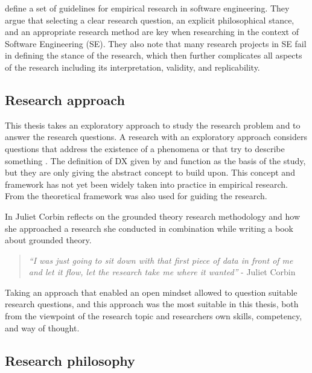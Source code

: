 \documentclass[english, 12pt, a4paper, sci, utf8, a-1b, online]{aaltothesis}
\begin{document}
\textcite{easterbrook2008selecting} define a set of guidelines for empirical research in software engineering. They argue that selecting a clear research question, an explicit philosophical stance, and an appropriate research method are key when researching in the context of Software Engineering (SE). They also note that many research projects in SE fail in defining the stance of the research, which then further complicates all aspects of the research including its interpretation, validity, and replicability.

\subsection{Research approach}

This thesis takes an exploratory approach to study the research problem and to answer the research questions. A research with an exploratory approach considers questions that address the existence of a phenomena or that try to describe something \parencite{easterbrook2008selecting}. The definition of DX given by \textcite{fagerholm-dx-concept-and-definition} and \textcite{fagerholm-doctoral-thesis} function as the basis of the study, but they are only giving the abstract concept to build upon. This concept and framework has not yet been widely taken into practice in empirical research. From \textcite{fagerholm-doctoral-thesis} the theoretical framework was also used for guiding the research.

In \textcite{developing-grounded-theory} Juliet Corbin reflects on the grounded theory research methodology and how she approached a research she conducted in combination while writing a book \parencite{basics-of-qualitative-research} about grounded theory.

\begin{quotation}
  \textit{``I was just going to sit down with that first piece of data in front of me and let it flow, let the research take me where it wanted''} - Juliet Corbin \parencite[p.~43]{developing-grounded-theory}
\end{quotation}

Taking an approach that enabled an open mindset allowed to question suitable research questions, and this approach was the most suitable in this thesis, both from the viewpoint of the research topic and researchers own skills, competency, and way of thought.

\subsection{Research philosophy} \label{section:research-philosophy}
\end{document}
